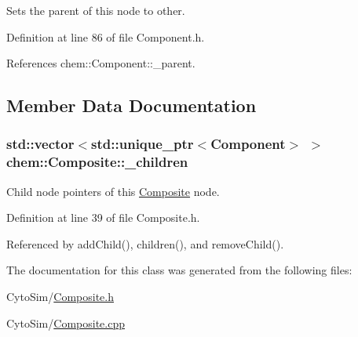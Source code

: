 Sets the parent of this node to other. 



Definition at line 86 of file Component.\-h.



References chem\-::\-Component\-::\-\_\-parent.



\subsection{Member Data Documentation}
\hypertarget{classchem_1_1Composite_a80fea5cefad1820315fbef6f8d7adf17}{
\subsubsection[{\-\_\-children}]{\setlength{\rightskip}{0pt plus 5cm}std\-::vector$<$std\-::unique\-\_\-ptr$<${\bf Component}$>$ $>$ {\bf chem\-::\-Composite\-::\-\_\-children}}}\label{classchem_1_1Composite_a80fea5cefad1820315fbef6f8d7adf17}


Child node pointers of this \hyperlink{classchem_1_1Composite}{Composite} node. 



Definition at line 39 of file Composite.\-h.



Referenced by add\-Child(), children(), and remove\-Child().



The documentation for this class was generated from the following files\-:\begin{DoxyCompactItemize}
\item 
Cyto\-Sim/\hyperlink{Composite_8h}{Composite.\-h}\item 
Cyto\-Sim/\hyperlink{Composite_8cpp}{Composite.\-cpp}\end{DoxyCompactItemize}
